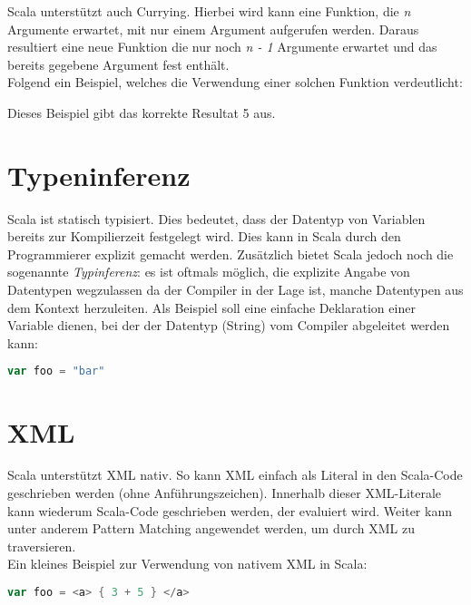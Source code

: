 Scala unterstützt auch Currying. Hierbei wird kann eine Funktion,
die \emph{n} Argumente erwartet, mit nur einem Argument aufgerufen werden. 
Daraus resultiert eine neue Funktion die nur noch \emph{n - 1} Argumente
erwartet und das bereits gegebene Argument fest enthält.\\

Folgend ein Beispiel, welches die Verwendung einer solchen Funktion
verdeutlicht: 



Dieses Beispiel gibt das korrekte Resultat 5 aus.


\section{Typeninferenz}

Scala ist statisch typisiert. Dies bedeutet, dass der Datentyp von
Variablen bereits zur Kompilierzeit festgelegt wird. Dies kann in Scala
durch den Programmierer explizit gemacht werden. Zusätzlich bietet Scala
jedoch noch die sogenannte \emph{Typinferenz}: es ist oftmals möglich,
die explizite Angabe von Datentypen wegzulassen da der Compiler in der
Lage ist, manche Datentypen aus dem Kontext herzuleiten. Als Beispiel
soll eine einfache Deklaration einer Variable dienen, bei der der Datentyp
(String) vom Compiler abgeleitet werden kann:

\begin{lstlisting}[float=ht,language=scala,caption=Automatisch hergeleiteter Datentyp,label=lst:typeinference]
var foo = "bar"
\end{lstlisting}


\section{XML}

Scala unterstützt XML nativ. So kann XML einfach als Literal in den
Scala-Code geschrieben werden (ohne Anführungszeichen). Innerhalb
dieser XML-Literale kann wiederum Scala-Code geschrieben werden, der
evaluiert wird.  Weiter kann unter anderem Pattern Matching angewendet
werden, um durch XML zu traversieren. \\

Ein kleines Beispiel zur Verwendung von nativem XML in Scala:
\begin{lstlisting}[float=ht,language=scala,caption={XML mit Code, der evaluiert wird},label=lst:xml]
var foo = <a> { 3 + 5 } </a>
\end{lstlisting}


